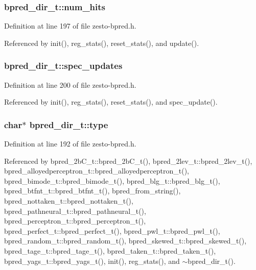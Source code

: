 \subsubsection[{num\_\-hits}]{ {\bf bpred\_\-dir\_\-t::num\_\-hits}\hspace{0.3cm}{\tt  [protected]}}\label{classbpred__dir__t_d06da5a7f4a14c4fc9aaeccfe372d670}




Definition at line 197 of file zesto-bpred.h.

Referenced by init(), reg\_\-stats(), reset\_\-stats(), and update().
\subsubsection[{spec\_\-updates}]{ {\bf bpred\_\-dir\_\-t::spec\_\-updates}\hspace{0.3cm}{\tt  [protected]}}\label{classbpred__dir__t_4c97447b42a0b9e1d79dd6e4df8f1430}




Definition at line 200 of file zesto-bpred.h.

Referenced by init(), reg\_\-stats(), reset\_\-stats(), and spec\_\-update().
\subsubsection[{type}]{\setlength{\rightskip}{0pt plus 5cm}char$\ast$ {\bf bpred\_\-dir\_\-t::type}\hspace{0.3cm}{\tt  [protected]}}\label{classbpred__dir__t_af2aa983e49e8feae174ab4fb5e1449c}




Definition at line 192 of file zesto-bpred.h.

Referenced by bpred\_\-2bC\_\-t::bpred\_\-2bC\_\-t(), bpred\_\-2lev\_\-t::bpred\_\-2lev\_\-t(), bpred\_\-alloyedperceptron\_\-t::bpred\_\-alloyedperceptron\_\-t(), bpred\_\-bimode\_\-t::bpred\_\-bimode\_\-t(), bpred\_\-blg\_\-t::bpred\_\-blg\_\-t(), bpred\_\-btfnt\_\-t::bpred\_\-btfnt\_\-t(), bpred\_\-from\_\-string(), bpred\_\-nottaken\_\-t::bpred\_\-nottaken\_\-t(), bpred\_\-pathneural\_\-t::bpred\_\-pathneural\_\-t(), bpred\_\-perceptron\_\-t::bpred\_\-perceptron\_\-t(), bpred\_\-perfect\_\-t::bpred\_\-perfect\_\-t(), bpred\_\-pwl\_\-t::bpred\_\-pwl\_\-t(), bpred\_\-random\_\-t::bpred\_\-random\_\-t(), bpred\_\-skewed\_\-t::bpred\_\-skewed\_\-t(), bpred\_\-tage\_\-t::bpred\_\-tage\_\-t(), bpred\_\-taken\_\-t::bpred\_\-taken\_\-t(), bpred\_\-yags\_\-t::bpred\_\-yags\_\-t(), init(), reg\_\-stats(), and $\sim$bpred\_\-dir\_\-t().
